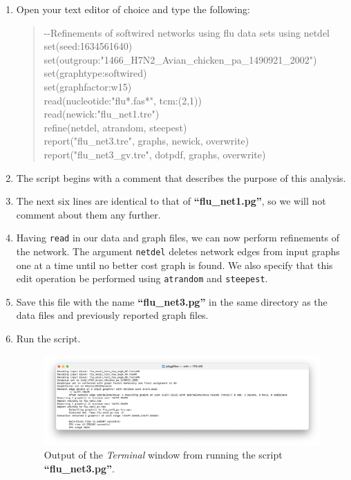 \documentclass[11pt]{article}
\begin{document}
\begin {enumerate}

\item Open your text editor of choice and type the following:

	\begin{quote}	
	-\/-Refinements of softwired networks using flu data sets using netdel\\
	set(seed:1634561640)\\
	set(outgroup:"1466\_H7N2\_Avian\_chicken\_pa\_1490921\_2002")\\
	set(graphtype:softwired)\\
	set(graphfactor:w15)\\ 
	read(nucleotide:"flu*.fas*", tcm:(2,1))\\
	read(newick:"flu\_net1.tre")\\
	refine(netdel, atrandom, steepest)\\
	report("flu\_net3.tre", graphs, newick, overwrite)\\
	report("flu\_net3\_gv.tre", dotpdf, graphs, overwrite)
	\end{quote}

\item The script begins with a comment that describes the purpose of this 
analysis.

\item The next six lines are identical to that of \textbf{``flu\_net1.pg''}, so we 
will not comment about them any further. 

\item Having \texttt{read} in our data and graph files, we can now perform 
refinements of the network. The argument \texttt{netdel} deletes network edges 
from input graphs one at a time until no better cost graph is found. We also 
specify that this edit operation be performed using \texttt{atrandom} and 
\texttt{steepest}.

\item Save this file with the name \textbf{``flu\_net3.pg''} in the same directory 
as the data files and previously reported graph files.

\item Run the script.

\begin{figure}[H]
\centering
\includegraphics[width=\textwidth]{output2.png}
\caption{Output of the \textit{Terminal} window from running the script 
\textbf{``flu\_net3.pg''}.}
\label{output2}
\end{figure}


\end{enumerate}
\end{document}
